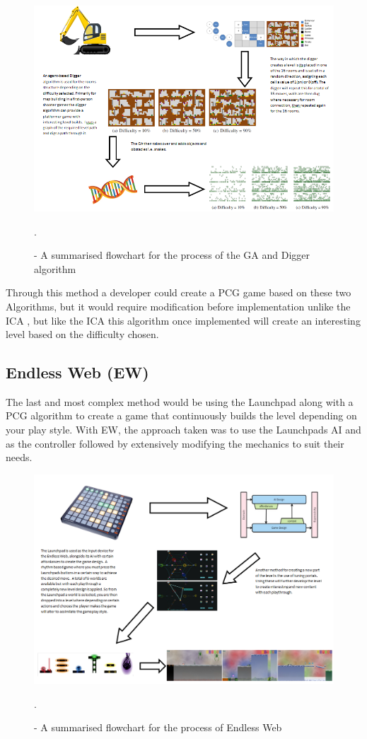\documentclass{scrartcl}
\begin{document}
\begin{figure}[h!]
	\centering
	\includegraphics[width=1.0\linewidth]{Flowchart2}
	\caption{ - A summarised flowchart for the process of the GA and Digger algorithm\cite{walaa}}.
	\label{Fig4}
\end{figure}

Through this method a developer could create a PCG game based on these two Algorithms, but it would require modification before implementation unlike the ICA \cite{walaa,fausto}, but like the ICA this algorithm once implemented will create an interesting level based on the difficulty chosen.

\subsection{Endless Web (EW)}

The last and most complex method would be using the Launchpad along with a PCG algorithm to create a game that continuously builds the level depending on your play style\cite{web}. With EW, the approach taken was to use the Launchpads AI and as the controller followed by extensively modifying the mechanics to suit their needs.

\begin{figure}[h]
	\centering
	\includegraphics[width=1.0\linewidth]{Flowchart3}
	\caption{ - A summarised flowchart for the process of Endless Web\cite{web,web2}}.
	\label{Fig5}
\end{figure}
\end{document}
